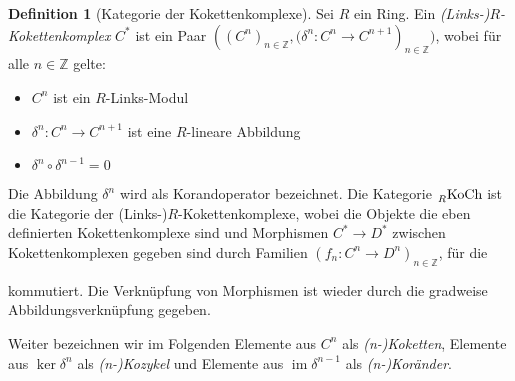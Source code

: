 \documentclass[a4paper,twoside,10pt]{scrreprt}
\DeclareMathOperator{\img}{im}
\newcommand{\Z}{\mathbb{Z}}
\theoremstyle{definition}
\newtheorem{definition}[satz]{Definition}
\begin{document}
\begin{definition}[Kategorie der Kokettenkomplexe]\label{def:CatCoChainComplex}
Sei $R$ ein Ring. Ein \emph{(Links-)$R$-Kokettenkomplex} $C^*$ ist ein Paar $\left(\left(C^n \right)_{n\in \Z},\bigl(\delta^n:C^n\to C^{n+1}\right)_{n\in \Z}\bigr)$, wobei für alle $n\in \Z$ gelte:
\begin{itemize}
\item $C^n$ ist ein $R$-Links-Modul
\item $\delta^n:C^n\to C^{n+1}$ ist eine $R$-lineare Abbildung
\item $\delta^n\circ \delta^{n-1}=0$
\end{itemize}
Die Abbildung $\delta^n$ wird als Korandoperator bezeichnet.
Die Kategorie $\prescript{}{R}{\text{KoCh}}$ ist die Kategorie der (Links-)$R$-Kokettenkomplexe, wobei die Objekte die eben definierten Kokettenkomplexe sind und Morphismen $C^*\to D^*$ zwischen Kokettenkomplexen gegeben sind durch Familien $(f_n:C^n\to D^n)_{n\in\Z}$, für die
\begin{center}
\end{center}
kommutiert. Die Verknüpfung von Morphismen ist wieder durch die gradweise Abbildungsverknüpfung gegeben.\par
Weiter bezeichnen wir im Folgenden Elemente aus $C^n$ als \textit{(n-)Koketten}, Elemente aus $\ker\delta^n$ als \textit{(n-)Kozykel} und Elemente aus $\img\delta^{n-1}$ als \textit{(n-)Koränder}.
\end{definition}
\end{document}
